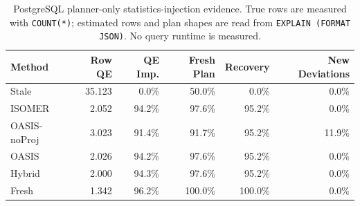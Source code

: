 \begin{table}[t]
  \centering
  \small
  \caption{PostgreSQL planner-only statistics-injection evidence. True rows are measured with \texttt{COUNT(*)}; estimated rows and plan shapes are read from \texttt{EXPLAIN (FORMAT JSON)}. No query runtime is measured.}
  \label{tab:postgres_planner_stats_injection}
  \setlength{\tabcolsep}{4pt}
  \begin{tabular}{lrrrrr}
    \toprule
    Method & Row QE & QE Imp. & Fresh Plan & Recovery & New Deviations \\
    \midrule
    Stale & 35.123 & 0.0\% & 50.0\% & 0.0\% & 0.0\% \\
    ISOMER & 2.052 & 94.2\% & 97.6\% & 95.2\% & 0.0\% \\
    OASIS-noProj & 3.023 & 91.4\% & 91.7\% & 95.2\% & 11.9\% \\
    OASIS & 2.026 & 94.2\% & 97.6\% & 95.2\% & 0.0\% \\
    Hybrid & 2.000 & 94.3\% & 97.6\% & 95.2\% & 0.0\% \\
    Fresh & 1.342 & 96.2\% & 100.0\% & 100.0\% & 0.0\% \\
    \bottomrule
  \end{tabular}
\end{table}
